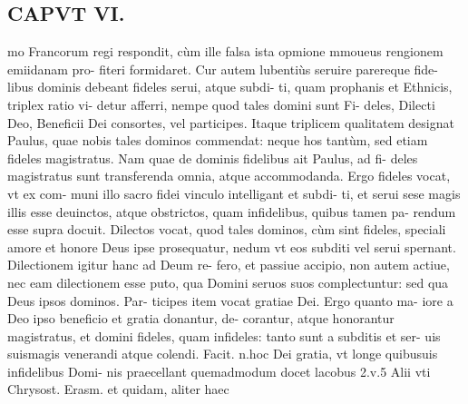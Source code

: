\documentclass{article}
\begin{document}
\begin{pages}
\section*{CAPVT  VI. }
\marginpar{[ p.421 ]}\pstart mo Francorum regi respondit, cùm ille falsa ista opmione mmoueus rengionem emiidanam pro- fiteri formidaret.  \pend\pstart Cur autem lubentiùs seruire parereque fide- libus dominis debeant fideles serui, atque subdi- ti, quam prophanis et Ethnicis, triplex ratio vi- detur afferri, nempe quod tales domini sunt Fi- deles, Dilecti Deo, Beneficii Dei consortes, vel participes. Itaque triplicem qualitatem designat Paulus, quae nobis tales dominos commendat: neque hos tantùm, sed etiam fideles magistratus. Nam quae de dominis fidelibus ait Paulus, ad fi- deles magistratus sunt transferenda omnia, atque  accommodanda. Ergo fideles vocat, vt ex com- muni illo sacro fidei vinculo intelligant et subdi- ti, et serui sese magis illis esse deuinctos, atque obstrictos, quam infidelibus, quibus tamen pa- rendum esse supra docuit.  \pend\pstart Dilectos vocat, quod tales dominos, cùm sint fideles, speciali amore et honore Deus ipse prosequatur, nedum vt eos subditi vel serui spernant. Dilectionem igitur hanc ad Deum re- fero, et passiue accipio, non autem actiue, nec eam dilectionem esse puto, qua Domini seruos suos complectuntur: sed qua Deus ipsos dominos. Par- ticipes item vocat gratiae Dei. Ergo quanto ma- iore a Deo ipso beneficio et gratia donantur, de- corantur, atque  honorantur magistratus, et domini fideles, quam infideles: tanto sunt a subditis et ser- uis suismagis venerandi atque  colendi. Facit. n.hoc Dei gratia, vt longe quibusuis infidelibus Domi- nis praecellant quemadmodum docet lacobus 2.v.5 Alii vti Chrysost. Erasm. et quidam, aliter haec  \pend

\end{pages}
\end{document}
